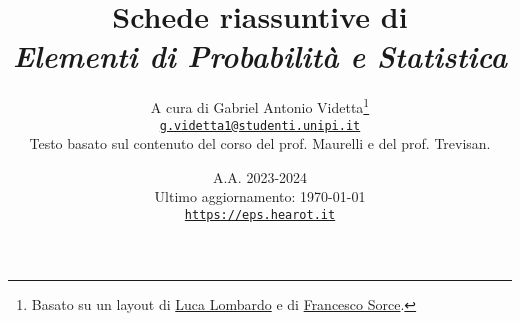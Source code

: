 \documentclass[10pt]{report}
\title{\Huge{Schede riassuntive di \\ \textit{Elementi di Probabilità e Statistica}}}
\date{A.A. 2023-2024 \\[0.6in] Ultimo aggiornamento: \today \\[1in] \href{https://eps.hearot.it}{\texttt{https://eps.hearot.it}}}
\author{A cura di Gabriel Antonio Videtta\footnote{Basato su un layout di \underline{Luca Lombardo} e di \underline{Francesco Sorce}.} \\ \href{mailto:g.videtta1@studenti.unipi.it}{\texttt{g.videtta1@studenti.unipi.it}} \\[0.3in] Testo basato sul contenuto del corso del prof. Maurelli e del prof. Trevisan.}
\begin{document}
\maketitle

\begin{multicols*}{2}
    \tableofcontents
\end{multicols*}

\newpage








\end{document}
